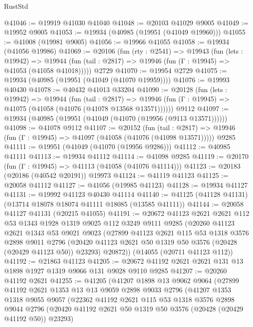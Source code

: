 \begin{lexlean}{RustStd}
\begin{coremodule}
@41046 := @19919 @41030 @41040
@41048 := @20103 @41029 @9005
@41049 := @19952 @9005
@41053 := @19934 (@40985 (@19951 (@41049 @19960)))
@41055 := @41008 (@19981 @9005)
@41056 := @19966 @41055
@41058 := @19934 (@41056 @19986)
@41069 := @20106
    (fun (rty : @2541) =>
    @19943
      (fun (lets : @19942) =>
      @19944 (fun (tail : @2817) => @19946 (fun (Γ : @19945) => @41053 (@41058 @41018)))))
    @2729
@41070 := @19954 @2729
@41075 := @19934 (@40985 (@19951 (@41049 (@41070 @19959))))
@41076 := @19993 @40430
@41078 := @40432 @41013 @33204
@41090 := @20128
    (fun (lets : @19942) =>
    @19944
      (fun (tail : @2817) =>
      @19946 (fun (Γ : @19945) => @41075 (@41058 (@41076 (@41078 @13568 @13571))))))
    @9112
@41097 := @19934 (@40985 (@19951 (@41049 (@41070 (@19956 (@9113 @13571))))))
@41098 := @41078 @9112
@41107 := @20152
    (fun (tail : @2817) => @19946 (fun (Γ : @19945) => @41097 (@41058 (@41076 (@41098 @13571)))))
    @9285
@41111 := @19951 (@41049 (@41070 (@19956 @9286)))
@41112 := @40985 @41111
@41113 := @19934 @41112
@41114 := @41098 @9285
@41119 := @20170 (fun (Γ : @19945) => @41113 (@41058 (@41076 @41114)))
@41123 := @20183 (@20186 (@40542 @20191)) @19973
@41124 := @41119 @41123
@41125 := @20058 @41112
@41127 := @41056 (@19985 @41123)
@41128 := @19934 @41127
@41131 := @19992 @41123 @40430 @41114
@41140 := @41125 (@41128 @41131) (@13714 @18078 @18074 @41111 @18085 (@13585 @41111))
@41144 := @20058 @41127 @41131 (@20215 @41055)
@41191 := @20672
    @41123
    @2621
    @2621
    @112
    @53
    @1343
    @1928
    @1319
    @9025
    @112
    @3249
    @9111
    @9285
    (@20260
      @41123
      @2621
      @1343
      @53
      @9021
      @9023
      (@27899
        @41123
        @2621
        @115
        @53
        @1318
        @3576
        @2898
        @9011
        @2796
        (@20420 @41123 @2621 @50 @1319 @50 @3576 (@20428 (@20429 @41123 @50)) @23293)
        @20872))
    (@14055 (@20711 @41123 @112))
@41192 := @21863 @41123
@41205 := @20672 @41192 @2621 @2621 @131 @13 @1898 @1927 @1319 @9066 @131 @9028 @9110 @9285
@41207 := @20260 @41192 @2621
@41255 := @41205
    (@41207
      @1898
      @13
      @9062
      @9064
      (@27899
        @41192
        @2621
        @1353
        @13
        @13
        @9059
        @2898
        @9033
        @2796
        (@41207
          @1353
          @1318
          @9055
          @9057
          (@22362
            @41192
            @2621
            @115
            @53
            @1318
            @3576
            @2898
            @9044
            @2796
            (@20420 @41192 @2621 @50 @1319 @50 @3576 (@20428 (@20429 @41192 @50)) @23293)

\end{coremodule}
\end{lexlean}
